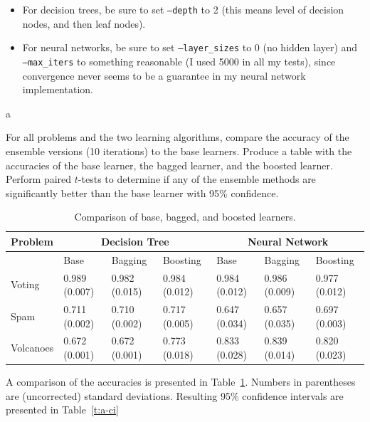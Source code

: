 \documentclass[fleqn]{homework}
\begin{document}
  \begin{itemize}
  \item For decision trees, be sure to set \texttt{--depth} to 2 (this means
    level of decision nodes, and then leaf nodes).
  \item For neural networks, be sure to set \texttt{--layer\_sizes} to 0 (no
    hidden layer) and \texttt{--max\_iters} to something reasonable (I used 5000
    in all my tests), since convergence never seems to be a guarantee in my
    neural network implementation.
  \end{itemize}

    \FloatBarrier
  \begin{problem}{a}
    \begin{question}
      For all problems and the two learning algorithms, compare the accuracy of
      the ensemble versions (10 iterations) to the base learners. Produce a
      table with the accuracies of the base learner, the bagged learner, and the
      boosted learner. Perform paired $t$-tests to determine if any of the
      ensemble methods are significantly better than the base learner with 95\%
      confidence.
    \end{question}
    \FloatBarrier

    \begin{table}[h]
    \centering
    \caption{Comparison of base, bagged, and boosted learners.}
    \label{t:a-comparison}
    \begin{tabular}{llll|lll}
      \toprule
      Problem & \multicolumn{3}{c}{Decision Tree} & \multicolumn{3}{c}{Neural Network} \\
      \midrule
             & Base          & Bagging       & Boosting      & Base          & Bagging      & Boosting       \\
      Voting & 0.989 (0.007) & 0.982 (0.015) & 0.984 (0.012) & 0.984 (0.012) & 0.986 (0.009) & 0.977 (0.012) \\
      Spam   & 0.711 (0.002) & 0.710 (0.002) & 0.717 (0.005) & 0.647 (0.034) & 0.657 (0.035) & 0.697 (0.003) \\
      Volcanoes&0.672 (0.001)& 0.672 (0.001) & 0.773 (0.018) & 0.833 (0.028) & 0.839 (0.014) & 0.820 (0.023) \\
      \bottomrule
    \end{tabular}
    \end{table}

    A comparison of the accuracies is presented in Table~\ref{t:a-comparison}.
    Numbers in parentheses are (uncorrected) standard deviations.  Resulting
    95\% confidence intervals are presented in Table~\ref{t:a-ci}


\end{problem}
\end{document}
